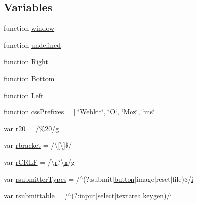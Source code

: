 \subsection*{Variables}
\begin{DoxyCompactItemize}
\item 
function \hyperlink{_scripts_2jquery-1_810_82_8js_a04a8a2bbfa9c15500892b8e5033d625b}{window}
\item 
function \hyperlink{_scripts_2jquery-1_810_82_8js_a08113a236cc18d2a9d5ce27e638012be}{undefined}
\item 
function \hyperlink{_scripts_2jquery-1_810_82_8js_ac7f66efc33d974809d85fc5bdb00c6eb}{Right}
\item 
function \hyperlink{_scripts_2jquery-1_810_82_8js_aff76c1cba4a00c678dfce0e0c5a5538a}{Bottom}
\item 
function \hyperlink{_scripts_2jquery-1_810_82_8js_abef68bf244a1159a49fe3a2c153a65d2}{Left}
\item 
function \hyperlink{_scripts_2jquery-1_810_82_8js_a2ed3892172b336458b8074254f4471da}{css\+Prefixes} = \mbox{[} \char`\"{}Webkit\char`\"{}, \char`\"{}O\char`\"{}, \char`\"{}Moz\char`\"{}, \char`\"{}ms\char`\"{} \mbox{]}
\item 
var \hyperlink{_scripts_2jquery-1_810_82_8js_a0e39f72d512af99fb5992d66f1a1c821}{r20} = /\%20/\hyperlink{_scripts_2respond_8min_8js_a103df269476e78897c9c4c6cb8f4eb06}{g}
\item 
var \hyperlink{_scripts_2jquery-1_810_82_8js_a07117e28ee58d2d2664cfbaf741e10c1}{rbracket} = /\textbackslash{}\mbox{[}\textbackslash{}\mbox{]}\$/
\item 
var \hyperlink{_scripts_2jquery-1_810_82_8js_a4fd9dfc4eb645b441a3e84730c50154b}{r\+C\+R\+LF} = /\textbackslash{}\hyperlink{_scripts_2ai_80_822_89-build00167_8min_8js_a07c0e0a63b5b484807c0331c78558c9e}{r}?\textbackslash{}\hyperlink{_scripts_2ai_80_822_89-build00167_8min_8js_afc984c4f6c68ce30a0af99006f5f8d27}{n}/\hyperlink{_scripts_2respond_8min_8js_a103df269476e78897c9c4c6cb8f4eb06}{g}
\item 
var \hyperlink{_scripts_2jquery-1_810_82_8js_a0e9cd4ca08945afe827846f34a36c74a}{rsubmitter\+Types} = /$^\wedge$(?\+:submit$\vert$\hyperlink{_scripts_2bootstrap_8min_8js_a55e170814e74f6c3db8ae9ea3ba9054f}{button}$\vert$image$\vert$reset$\vert$file)\$/\hyperlink{_scripts_2respond_8min_8js_a5e25b1d1bed9ab5f3174b76d6a722180}{i}
\item 
var \hyperlink{_scripts_2jquery-1_810_82_8js_a12d248d7e6c5985c5ea21f56fbef9e90}{rsubmittable} = /$^\wedge$(?\+:input$\vert$select$\vert$textarea$\vert$keygen)/\hyperlink{_scripts_2respond_8min_8js_a5e25b1d1bed9ab5f3174b76d6a722180}{i}

\end{DoxyCompactItemize}
